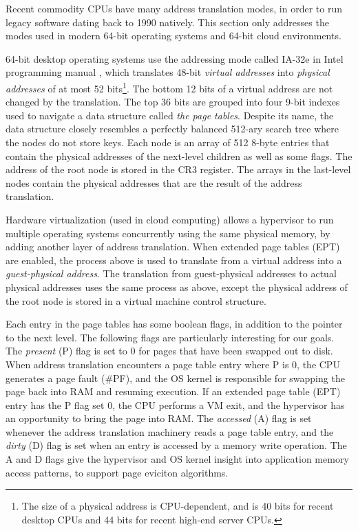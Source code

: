 Recent commodity CPUs have many address translation modes, in order to run
legacy software dating back to 1990 natively. This section only addresses the
modes used in modern 64-bit operating systems and 64-bit cloud environments.

64-bit desktop operating systems use the addressing mode called IA-32e in
Intel programming manual \cite{intel2013manual}, which translates 48-bit
\textit{virtual addresses} into \textit{physical addresses} of at most 52
bits\footnote{The size of a physical address is CPU-dependent, and is 40 bits
for recent desktop CPUs and 44 bits for recent high-end server CPUs.}. The
bottom 12 bits of a virtual address are not changed by the translation. The top
36 bits are grouped into four 9-bit indexes used to navigate a data structure
called \textit{the page tables}. Despite its name, the data structure closely
resembles a perfectly balanced 512-ary search tree where the nodes do not store
keys. Each node is an array of 512 8-byte entries that contain the physical
addresses of the next-level children as well as some flags. The address of the
root node is stored in the CR3 register. The arrays in the last-level nodes
contain the physical addresses that are the result of the address translation.

Hardware virtualization (used in cloud computing) allows a hypervisor to run
multiple operating systems concurrently using the same physical memory, by
adding another layer of address translation. When extended page tables (EPT)
are enabled, the process above is used to translate from a virtual address into
a \textit{guest-physical address}. The translation from guest-physical
addresses to actual physical addresses uses the same process as above, except
the physical address of the root node is stored in a virtual machine control
structure.

Each entry in the page tables has some boolean flags, in addition to the
pointer to the next level. The following flags are particularly interesting for
our goals. The \textit{present} (P) flag is set to 0 for pages that have been
swapped out to disk. When address translation encounters a page table entry
where P is 0, the CPU generates a page fault (\#PF), and the OS kernel is
responsible for swapping the page back into RAM and resuming execution. If
an extended page table (EPT) entry has the P flag set 0, the CPU performs a VM
exit, and the hypervisor has an opportunity to bring the page into RAM. The
\textit{accessed} (A) flag is set whenever the address translation machinery
reads a page table entry, and the \textit{dirty} (D) flag is set when an entry
is accessed by a memory write operation. The A and D flags give the hypervisor
and OS kernel insight into application memory access patterns, to support page
eviciton algorithms.

